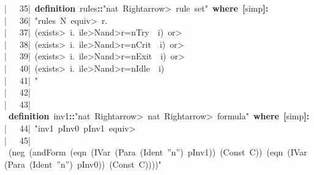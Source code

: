 \documentclass{article}
\newcommand{\syntaxKEYWORDA}[1]{\textcolor[rgb]{0.0,0.4,0.6}{\textbf{#1}}}
\newcommand{\syntaxKEYWORDB}[1]{\textcolor[rgb]{0.0,0.6,0.4}{\textbf{#1}}}
\newcommand{\syntaxLITERALA}[1]{\textcolor[rgb]{1.0,0.0,0.8}{#1}}
\newcommand{\syntaxOPERATOR}[1]{\textcolor[rgb]{0.0,0.0,0.0}{\textbf{#1}}}
\newcommand{\syntaxKEYWORDA}[1]{\textcolor[rgb]{0.0,0.4,0.6}{\textbf{#1}}}
\newcommand{\syntaxKEYWORDB}[1]{\textcolor[rgb]{0.0,0.6,0.4}{\textbf{#1}}}
\newcommand{\syntaxLITERALA}[1]{\textcolor[rgb]{1.0,0.0,0.8}{#1}}
\newcommand{\syntaxOPERATOR}[1]{\textcolor[rgb]{0.0,0.0,0.0}{\textbf{#1}}}
\newcommand{\syntaxKEYWORDA}[1]{\textcolor[rgb]{0.0,0.4,0.6}{\textbf{#1}}}
\newcommand{\syntaxKEYWORDB}[1]{\textcolor[rgb]{0.0,0.6,0.4}{\textbf{#1}}}
\newcommand{\syntaxLITERALA}[1]{\textcolor[rgb]{1.0,0.0,0.8}{#1}}
\newcommand{\syntaxOPERATOR}[1]{\textcolor[rgb]{0.0,0.0,0.0}{\textbf{#1}}}
\newcommand{\syntaxKEYWORDA}[1]{\textcolor[rgb]{0.0,0.4,0.6}{#1}}
\newcommand{\syntaxKEYWORDB}[1]{\textcolor[rgb]{0.0,0.6,0.4}{#1}}
\newcommand{\syntaxLITERALA}[1]{\textcolor[rgb]{1.0,0.0,0.8}{\textbf{#1}}}
\newcommand{\syntaxOPERATOR}[1]{\textcolor[rgb]{0.0,0.0,0.0}{#1}}
\newcommand{\syntaxKEYWORDA}[1]{\textcolor[rgb]{0.0,0.4,0.6}{#1}}
\newcommand{\syntaxKEYWORDB}[1]{\textcolor[rgb]{0.0,0.6,0.4}{#1}}
\newcommand{\syntaxLITERALA}[1]{\textcolor[rgb]{1.0,0.0,0.8}{#1}}
\newcommand{\syntaxOPERATOR}[1]{\textcolor[rgb]{0.0,0.0,0.0}{#1}}
\newcommand{\syntaxKEYWORDA}[1]{\textcolor[rgb]{0.0,0.4,0.6}{\textbf{#1}}}
\newcommand{\syntaxKEYWORDB}[1]{\textcolor[rgb]{0.0,0.6,0.4}{\textbf{#1}}}
\newcommand{\syntaxLITERALA}[1]{\textcolor[rgb]{1.0,0.0,0.8}{#1}}
\newcommand{\syntaxOPERATOR}[1]{\textcolor[rgb]{0.0,0.0,0.0}{\textbf{#1}}}
\newcommand{\gutter}[1]{\textcolor[rgb]{0,0,0}{{|}#1}}
\newcommand{\gutterH}[1]{\textcolor[rgb]{1,0,0}{{|}#1}}
\begin{document}
\gutterH{\ \ \ 35{|}\ }\syntaxKEYWORDA{definition}{\ }rules\syntaxOPERATOR{::}\syntaxLITERALA{"nat{\ }\<Rightarrow>{\ }rule{\ }set"}{\ }\syntaxKEYWORDB{where}{\ }\syntaxOPERATOR{{[}}simp\syntaxOPERATOR{{]}}\syntaxOPERATOR{:}\hspace*{\fill}\\
\gutter{\ \ \ 36{|}\ }\syntaxLITERALA{"rules{\ }N{\ }\<equiv>{\ }\usebox{\opencurlybracket}r.}\hspace*{\fill}\\
\gutter{\ \ \ 37{|}\ }\syntaxLITERALA{(\<exists>{\ }i.{\ }i\<le>N\<and>r=n\usebox{\underscorebox}Try{\ }{\ }i){\ }\<or>}\hspace*{\fill}\\
\gutter{\ \ \ 38{|}\ }\syntaxLITERALA{(\<exists>{\ }i.{\ }i\<le>N\<and>r=n\usebox{\underscorebox}Crit{\ }{\ }i){\ }\<or>}\hspace*{\fill}\\
\gutter{\ \ \ 39{|}\ }\syntaxLITERALA{(\<exists>{\ }i.{\ }i\<le>N\<and>r=n\usebox{\underscorebox}Exit{\ }{\ }i){\ }\<or>}\hspace*{\fill}\\
\gutterH{\ \ \ 40{|}\ }\syntaxLITERALA{(\<exists>{\ }i.{\ }i\<le>N\<and>r=n\usebox{\underscorebox}Idle{\ }{\ }i)}\hspace*{\fill}\\
\gutter{\ \ \ 41{|}\ }\syntaxLITERALA{\usebox{\closecurlybracket}"}\hspace*{\fill}\\
\gutter{\ \ \ 42{|}\ }\hspace*{\fill}\\
\gutter{\ \ \ 43{|}\ }\syntaxKEYWORDA{definition}{\ }inv\usebox{\underscorebox}\usebox{\underscorebox}1\syntaxOPERATOR{::}\syntaxLITERALA{"nat{\ }\<Rightarrow>{\ }nat{\ }\<Rightarrow>{\ }formula"}{\ }\syntaxKEYWORDB{where}{\ }\syntaxOPERATOR{{[}}simp\syntaxOPERATOR{{]}}\syntaxOPERATOR{:}\hspace*{\fill}\\
\gutter{\ \ \ 44{|}\ }\syntaxLITERALA{"inv\usebox{\underscorebox}\usebox{\underscorebox}1{\ }p\usebox{\underscorebox}\usebox{\underscorebox}Inv0{\ }p\usebox{\underscorebox}\usebox{\underscorebox}Inv1{\ }\<equiv>}\hspace*{\fill}\\
\gutterH{\ \ \ 45{|}\ }\syntaxLITERALA{(neg{\ }(andForm{\ }(eqn{\ }(IVar{\ }(Para{\ }(Ident{\ }''n''){\ }p\usebox{\underscorebox}\usebox{\underscorebox}Inv1)){\ }(Const{\ }C)){\ }(eqn{\ }(IVar{\ }(Para{\ }(Ident{\ }''n''){\ }p\usebox{\underscorebox}\usebox{\underscorebox}Inv0)){\ }(Const{\ }C))))"}\hspace*{\fill}\\
\end{document}
